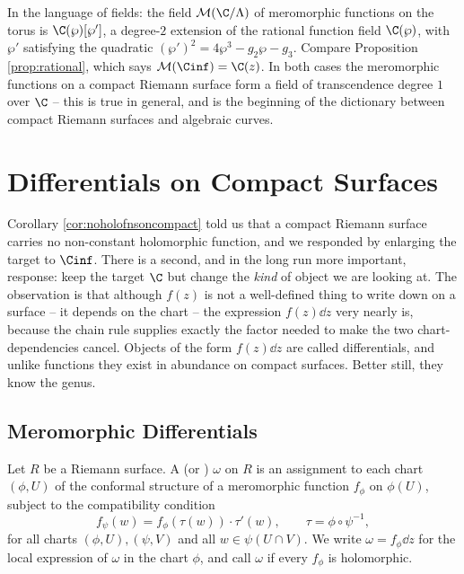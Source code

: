 In the language of fields: the field $\mathcal{M}(\C/\Lambda)$ of meromorphic functions on
the torus is $\C(\wp)[\wp']$, a degree-$2$ extension of the rational function field
$\C(\wp)$, with $\wp'$ satisfying the quadratic $(\wp')^2 = 4\wp^3-g_2\wp-g_3$. Compare
Proposition \ref{prop:rational}, which says $\mathcal{M}(\Cinf) = \C(z)$. In both cases
the meromorphic functions on a compact Riemann surface form a field of transcendence
degree $1$ over $\C$ -- this is true in general, and is the beginning of the dictionary
between compact Riemann surfaces and algebraic curves.

\section{Differentials on Compact Surfaces}\label{rs-sec:differentials}

Corollary \ref{cor:noholofnsoncompact} told us that a compact Riemann surface carries no
non-constant holomorphic function, and we responded by enlarging the target to $\Cinf$.
There is a second, and in the long run more important, response: keep the target $\C$ but
change the \emph{kind} of object we are looking at. The observation is that although
$f(z)$ is not a well-defined thing to write down on a surface -- it depends on the chart
-- the expression $f(z)\dd z$ very nearly is, because the chain rule supplies exactly the
factor needed to make the two chart-dependencies cancel. Objects of the form $f(z)\dd z$
are called differentials, and unlike functions they exist in abundance on compact
surfaces. Better still, they know the genus.

\subsection{Meromorphic Differentials}

\begin{definition}
	Let $R$ be a Riemann surface. A  (or
	) $\omega$ on $R$ is an assignment to each chart
	$(\phi, U)$ of the conformal structure of a meromorphic function $f_\phi$ on
	$\phi(U)$, subject to the compatibility condition
	$$
	f_\psi(w) = f_\phi\left(\tau(w)\right)\cdot\tau'(w), \qquad
	\tau = \phi\circ\psi^{-1},
	$$
	for all charts $(\phi,U), (\psi,V)$ and all $w \in \psi(U\cap V)$. We write
	$\omega = f_\phi \dd z$ for the local expression of $\omega$ in the chart $\phi$, and
	call $\omega$  if every $f_\phi$ is holomorphic.
\end{definition}

